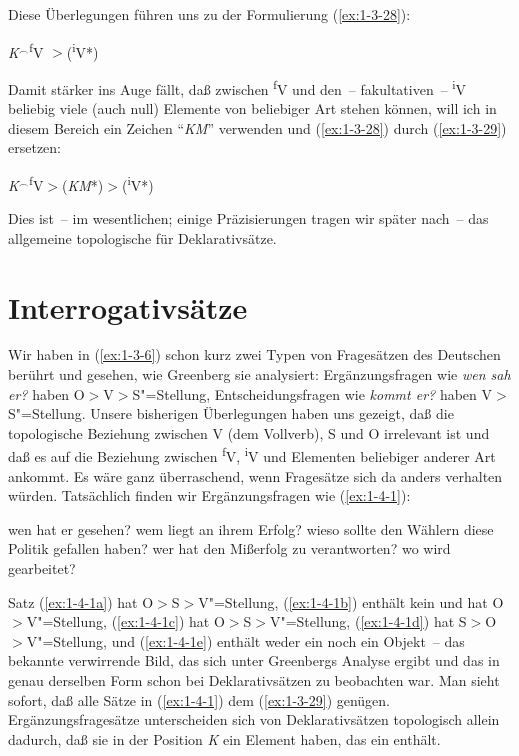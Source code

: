 \documentclass[output=paper]{langsci/langscibook}
\begin{document}
Diese Überlegungen führen uns zu der Formulierung (\ref{ex:1-3-28}):
\begin{exe}
\ex\label{ex:1-3-28}
\textit{K}$^{\smallfrown}$\textsuperscript{f}V $>$(\textsuperscript{i}V*)
\end{exe}
Damit stärker ins Auge fällt, daß zwischen \textsuperscript{f}V und den~-- fakultativen~-- \textsuperscript{i}V beliebig
viele (auch null) Elemente von beliebiger Art stehen können, will ich in diesem Bereich ein Zeichen "`\textit{KM}"' verwenden und (\ref{ex:1-3-28}) durch (\ref{ex:1-3-29}) ersetzen:
\begin{exe}
\ex\label{ex:1-3-29}
\textit{K}$^{\smallfrown}$\textsuperscript{f}V$>$(\textit{KM}*)$>$(\textsuperscript{i}V*)
\end{exe}
Dies ist~-- im wesentlichen; einige Präzisierungen tragen wir später nach~-- das allgemeine topologische  für Deklarativsätze.

\section{Interrogativsätze}%
\label{sec:1-4}

\ssubsection{}%
\label{subsec:1-4.1}
Wir haben in (\ref{ex:1-3-6}) schon kurz zwei Typen von Fragesätzen des Deutschen berührt und
gesehen, wie Greenberg sie analysiert: Ergänzungsfragen wie \textit{wen sah er?} haben O$>$V$>$S"=Stellung, Entscheidungsfragen wie \textit{kommt er?} haben V$>$S"=Stellung. Unsere bisherigen Überlegungen haben uns gezeigt, daß die topologische Beziehung zwischen V (dem Vollverb), S und O irrelevant ist und daß es auf die Beziehung zwischen \textsuperscript{f}V, \textsuperscript{i}V und Elementen beliebiger anderer Art ankommt. Es wäre ganz
überraschend, wenn Fragesätze sich da anders verhalten würden. Tatsächlich finden
wir Ergänzungsfragen wie (\ref{ex:1-4-1}):
\begin{exe}
\ex\label{ex:1-4-1}
\begin{xlist}
\ex\label{ex:1-4-1a} wen hat er gesehen?
\ex\label{ex:1-4-1b} wem liegt an ihrem Erfolg?
\ex\label{ex:1-4-1c} wieso sollte den Wählern diese Politik gefallen haben?
\ex\label{ex:1-4-1d} wer hat den Mißerfolg zu verantworten?
\ex\label{ex:1-4-1e} wo wird gearbeitet?
\end{xlist}
\end{exe}
Satz (\ref{ex:1-4-1a}) hat O$>$S$>$V"=Stellung, (\ref{ex:1-4-1b})
enthält kein  und hat O$>$V"=Stellung, (\ref{ex:1-4-1c}) hat
O$>$S$>$V"=Stellung, (\ref{ex:1-4-1d}) hat S$>$O$>$V"=Stellung, und
(\ref{ex:1-4-1e}) enthält weder ein  noch ein Objekt~-- das
bekannte verwirrende Bild, das sich unter Greenbergs Analyse ergibt
und das in genau derselben Form schon bei Deklarativsätzen zu
beobachten war. Man sieht sofort, daß alle Sätze in (\ref{ex:1-4-1})
dem  (\ref{ex:1-3-29}) genügen. Ergänzungsfragesätze
unterscheiden sich von Deklarativsätzen topologisch allein dadurch,
daß sie in der Position \textit{K} ein Element haben, das ein
 enthält.
\end{document}
